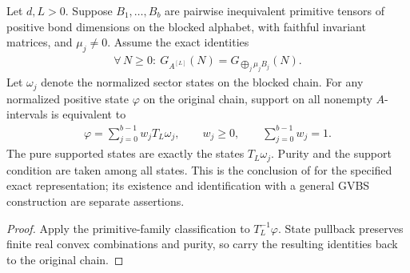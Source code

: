 \begin{lemma}
    \label{thm:blocked_primitive_supported_state_classification}
    \leanok
    Let $d,L>0$. Suppose $B_1,\ldots,B_b$ are pairwise inequivalent
    primitive tensors of positive bond dimensions on the blocked alphabet,
    with faithful invariant matrices, and $\mu_j\ne0$. Assume the exact identities
    \begin{align}
        \forall\,N\geq0:\ G_{A^{[L]}}(N)=G_{\bigoplus_j\mu_j B_j}(N).
    \end{align}
    Let $\omega_j$ denote the normalized sector states on the blocked
    chain. For any normalized positive state $\varphi$ on the original
    chain, support on all nonempty $A$-intervals is equivalent to
    \begin{align}
        \varphi=\sum_{j=0}^{b-1} w_j T_L\omega_j,
        \qquad w_j\geq0,\qquad \sum_{j=0}^{b-1} w_j=1.
    \end{align}
    The pure supported states are exactly the states $T_L\omega_j$.
    Purity and the support condition are taken among all states.
    This is the conclusion of
    \cite[Theorem~1.1, lines~854--926]{Nachtergaele1996Spectral}
    for the specified exact representation; its existence and identification
    with a general GVBS construction are separate assertions.
\end{lemma}
\begin{proof}\leanok
    Apply the primitive-family classification to $T_L^{-1}\varphi$.
    State pullback preserves finite real convex combinations and purity,
    so carry the resulting identities back to the original chain.
\end{proof}

